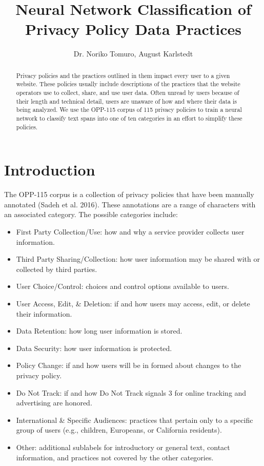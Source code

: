 \documentclass[12pt, letterpaper]{article}
\title{Neural Network Classification of Privacy Policy Data Practices}
\author{Dr. Noriko Tomuro, August Karlstedt}
\begin{document}
\maketitle

\begin{abstract}
Privacy policies and the practices outlined in them impact every user to a given website. These policies usually include descriptions of the practices that the website operators use to collect, share, and use user data. Often unread by users because of their length and technical detail, users are unaware of how and where their data is being analyzed. We use the OPP-115 corpus of 115 privacy policies to train a neural network to classify text spans into one of ten categories in an effort to simplify these policies.
\end{abstract}

\section{Introduction}
The OPP-115 corpus is a collection of privacy policies that have been manually annotated (Sadeh et al. 2016). These annotations are a range of characters with an associated category. The possible categories include:

\begin{itemize}
\item First Party Collection/Use: how and why a service provider collects user information.
\item Third Party Sharing/Collection: how user information may be shared with or collected by third parties.
\item User Choice/Control: choices and control options available to users.
\item User Access, Edit, \& Deletion: if and how users may access, edit, or delete their information.
\item Data Retention: how long user information is stored.
\item Data Security: how user information is protected.
\item Policy Change: if and how users will be in formed about changes to the privacy policy.
\item Do Not Track: if and how Do Not Track signals 3 for online tracking and advertising are honored.
\item International \& Specific Audiences: practices that pertain only to a specific group of users (e.g., children, Europeans, or California residents).
\item Other: additional sublabels for introductory or general text, contact information, and practices not covered by the other categories.
\end{itemize}
\end{document}

